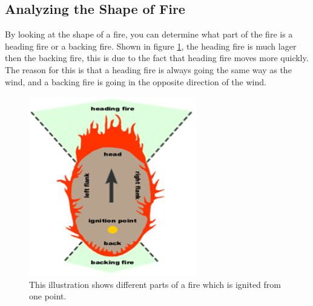 \subsection{Analyzing the Shape of Fire}
By looking at the shape of a fire, you can determine what part of the fire is a heading fire or a backing fire. Shown in figure \ref{fig:fire-ignition}, the heading fire is much lager then the backing fire, this is due to the fact that heading fire moves more quickly. The reason for this is that a heading fire is always going the same way as the wind, and a backing fire is going in the opposite direction of the wind.
\begin{figure}[here]
  \centering
      \includegraphics[width=0.65\textwidth]{theory/graphics/fire-ignition.png}
  \caption{ This illustration shows different parts of a fire which is ignited from one point. }
  \label{fig:fire-ignition}
\end{figure}
